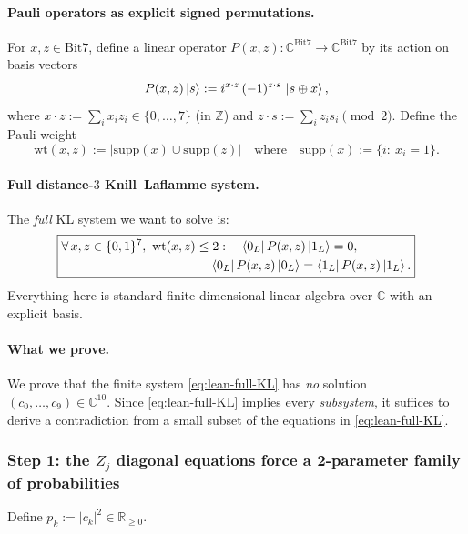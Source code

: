 \documentclass[11pt]{article}
\newcommand{\wt}{\mathrm{wt}}
\newcommand{\supp}{\mathrm{supp}}
\newcommand{\Bit}{\mathrm{Bit}}
\begin{document}
\paragraph{Pauli operators as explicit signed permutations.}
For $x,z\in\Bit7$, define a linear operator $P(x,z):\mathbb C^{\Bit7}\to\mathbb C^{\Bit7}$ by its action on basis vectors
\begin{equation}
P(x,z)\ket{s} := i^{x\cdot z}\,(-1)^{z\cdot s}\,\ket{s\oplus x},
\label{eq:lean-pauli-action}
\end{equation}
where $x\cdot z:=\sum_i x_i z_i\in\{0,\dots,7\}$ (in $\mathbb Z$) and $z\cdot s:=\sum_i z_i s_i\pmod 2$.
Define the Pauli weight
\[
\wt(x,z):=\bigl|\supp(x)\cup\supp(z)\bigr|
\quad\text{where}\quad
\supp(x):=\{i:\ x_i=1\}.
\]

\paragraph{Full distance-$3$ Knill--Laflamme system.}
The \emph{full} KL system we want to solve is:
\begin{equation}
\boxed{
\begin{aligned}
&\forall\, x,z\in\{0,1\}^7,\ \mathrm{wt}(x,z)\le 2:\quad
\bra{0_L}P(x,z)\ket{1_L}=0,\\
&\hspace{4.1cm}
\bra{0_L}P(x,z)\ket{0_L}=\bra{1_L}P(x,z)\ket{1_L}.
\end{aligned}}
\label{eq:lean-full-KL}
\end{equation}
Everything here is standard finite-dimensional linear algebra over $\mathbb C$ with an explicit basis.

\paragraph{What we prove.}
We prove that the finite system \eqref{eq:lean-full-KL} has \emph{no} solution $(c_0,\dots,c_9)\in\mathbb C^{10}$.
Since \eqref{eq:lean-full-KL} implies every \emph{subsystem}, it suffices to derive a contradiction from a small subset of
the equations in \eqref{eq:lean-full-KL}.

\subsubsection*{Step 1: the $Z_j$ diagonal equations force a 2-parameter family of probabilities}

Define $p_k:=|c_k|^2\in\mathbb R_{\ge 0}$.
\end{document}
